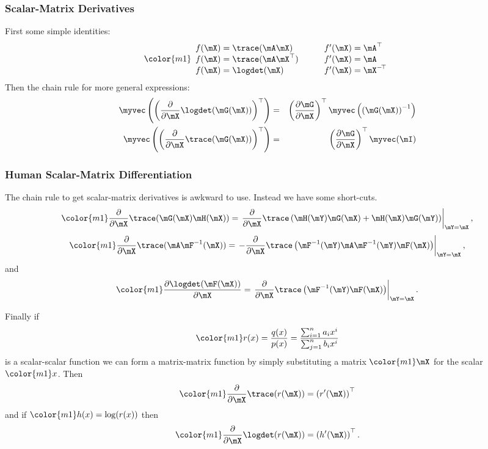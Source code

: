 \begin{frame}
\frametitle{Scalar-Matrix Derivatives}
First some simple identities:
$$\color{m1}
\begin{array}{ll}
f(\mX)=\trace(\mA\mX) & \qquad f'(\mX) = \mA^\top \\
f(\mX)=\trace(\mA\mX^\top) & \qquad f'(\mX) = \mA \\
f(\mX)=\logdet(\mX) & \qquad f'(\mX) = \mX^{-\!\top}
\end{array}
$$
Then the chain rule for more general expressions:
{\color{m1}
\begin{eqnarray*}
\myvec\left(\left(\frac{\partial}{\partial
  \mX}\logdet(\mG(\mX))\right)^\top\right) &=&
\left(\frac{\partial\mG}{\partial\mX}\right)^\top\myvec\left(\left(\mG(\mX)\right)^{-1}\right)\\
\myvec\left(\left(\frac{\partial}{\partial
  \mX}\trace(\mG(\mX))\right)^\top\right) &=&
\left(\frac{\partial\mG}{\partial\mX}\right)^\top\myvec(\mI)
\end{eqnarray*}}
\end{frame}

\begin{frame}
\frametitle{Human Scalar-Matrix Differentiation}
The chain rule to get scalar-matrix derivatives is awkward to use.
Instead we have some short-cuts.\\
\medskip
$$\color{m1}
\frac{\partial }{\partial
  \mX}\trace(\mG(\mX)\mH(\mX))=
\left.\frac{\partial}{\partial
  \mX}
\trace\left(\mH(\mY)\mG(\mX)+\mH(\mX)\mG(\mY)\right)\right|_{\mY=\mX},
$$
$$\color{m1}
\frac{\partial}{\partial \mX}
\trace(\mA\mF^{-1}(\mX))
= \left.-\frac{\partial}{\partial
  \mX}
\trace\left(\mF^{-1}(\mY)\mA\mF^{-1}(\mY)\mF(\mX)\right)\right|_{\mY=\mX},
$$
and
$$\color{m1}
\frac{\partial \logdet(\mF(\mX))}{\partial
  \mX} =
\left.\frac{\partial}{\partial
  \mX} \trace\left(\mF^{-1}(\mY)\mF(\mX)\right)\right|_{\mY=\mX}.
$$
\end{frame}

\begin{frame}
Finally if 
$$\color{m1}
r(x)=\frac{q(x)}{p(x)}=\frac{\sum_{i=1}^na_i x^i}{\sum_{j=1}^nb_ix^i}
$$
is a scalar-scalar function we can form a matrix-matrix function by simply
substituting a matrix $\color{m1}\mX$ for the scalar $\color{m1}x$.
Then 
$$\color{m1}
\frac{\partial}{\partial\mX}\trace(r(\mX)) = \left(r'(\mX)\right)^\top
$$
and if $\color{m1}h(x)=\log(r(x))$ then
$$\color{m1}
\frac{\partial}{\partial\mX}\logdet(r(\mX)) = \left(h'(\mX)\right)^\top.
$$
\end{frame}

